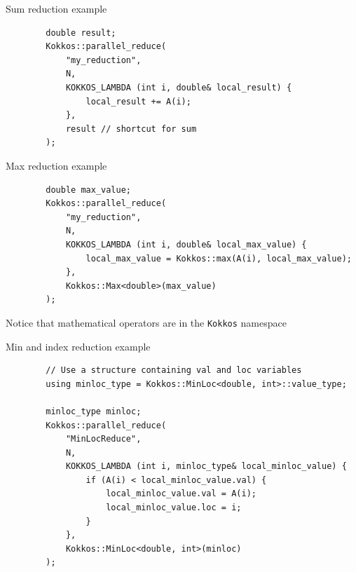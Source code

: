 \documentclass[aspectratio=169]{beamer}
\begin{document}

\begin{frame}[fragile]{Sum reduction example}
    \begin{verbatim}
        double result;
        Kokkos::parallel_reduce(
            "my_reduction",
            N,
            KOKKOS_LAMBDA (int i, double& local_result) {
                local_result += A(i);
            },
            result // shortcut for sum
        );
    \end{verbatim}
\end{frame}


\begin{frame}[fragile]{Max reduction example}
    \begin{verbatim}
        double max_value;
        Kokkos::parallel_reduce(
            "my_reduction",
            N,
            KOKKOS_LAMBDA (int i, double& local_max_value) {
                local_max_value = Kokkos::max(A(i), local_max_value);
            },
            Kokkos::Max<double>(max_value)
        );
    \end{verbatim}

     Notice that mathematical operators are in the \texttt{Kokkos} namespace
\end{frame}


\begin{frame}[fragile]{Min and index reduction example}
    \begin{verbatim}
        // Use a structure containing val and loc variables
        using minloc_type = Kokkos::MinLoc<double, int>::value_type;

        minloc_type minloc;
        Kokkos::parallel_reduce(
            "MinLocReduce",
            N,
            KOKKOS_LAMBDA (int i, minloc_type& local_minloc_value) {
                if (A(i) < local_minloc_value.val) {
                    local_minloc_value.val = A(i);
                    local_minloc_value.loc = i;
                }
            },
            Kokkos::MinLoc<double, int>(minloc)
        );
    \end{verbatim}
\end{frame}

\end{document}
